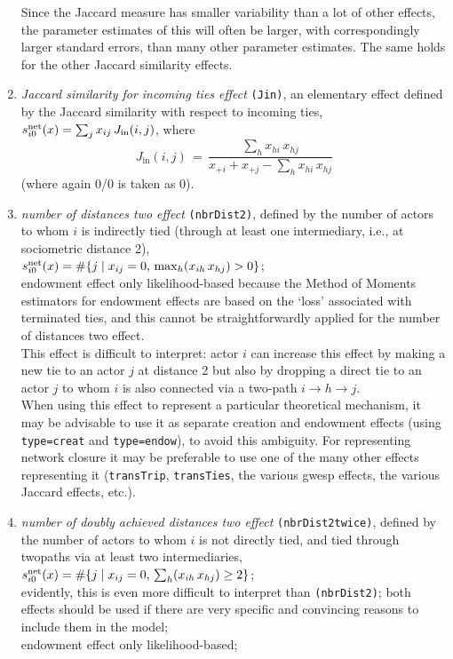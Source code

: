 \documentclass[a4paper,fleqn,11pt]{article}
\newcommand{\+}{\, + \,}
\newcommand{\vit}{\theenumi}
\begin{document}
\begin{enumerate}
 \noindent
 Since the Jaccard measure has smaller variability than a lot of other
 effects, the parameter estimates of this will often be larger,
 with correspondingly larger standard errors,
 than many other parameter estimates. The same holds for
 the other Jaccard similarity effects.

 \item {\em Jaccard similarity for incoming ties effect} \texttt{(Jin)},
 an elementary effect defined by
 the Jaccard similarity with respect to incoming ties,\\
 $s^{\rm net}_{i\vit}(x) =  \sum_j x_{ij} \, J_{\text{in}}(i,j)$, where
 \[
 J_{\text{in}}(i,j) \,=\, \frac{\sum_h x_{hi}\,x_{hj}}
                     {x_{+i} + x_{+j} - \sum_h x_{hi}\,x_{hj}}
 \]
 (where again 0/0 is taken as 0).

 \item {\em number of distances two effect} \texttt{(nbrDist2)},
 \hypertarget{T_dist2}{defined by}
 the number of actors to whom $i$ is indirectly tied
 (through at least one intermediary, i.e., at sociometric distance 2),\\
 $s^{\rm net}_{i\vit}(x) =  \#\{j \mid x_{ij} = 0,\, \max_h (x_{ih}\, x_{hj}) > 0 \}$;\\
 endowment effect only likelihood-based because the Method of Moments
 estimators for endowment effects are based on the `loss' associated
 with terminated ties, and this cannot be straightforwardly applied
 for the number of distances two effect.\\
 This effect is difficult to interpret: actor $i$ can increase this effect by making a
 new tie to an actor $j$ at distance 2 but also by dropping a direct tie to an
 actor $j$ to whom $i$ is also connected via a two-path
 $i \rightarrow h \rightarrow j$.\\
 When using this effect to represent a particular theoretical mechanism,
 it may be advisable to use it as separate creation
 and endowment effects (using  \texttt{type=creat} and \texttt{type=endow}),
 to avoid this ambiguity.
 For representing network closure it may be preferable to use one of the many other
 effects representing it (\texttt{transTrip}, \texttt{transTies},
 the various gwesp effects, the various Jaccard effects, etc.).\\


 \item {\em number of doubly achieved distances two effect} \texttt{(nbrDist2twice)},
 defined by
 the number of actors to whom $i$
 is not directly tied, and tied through twopaths via at least two intermediaries,\\
 $s^{\rm net}_{i\vit}(x) =  \#\{j \mid x_{ij} = 0,\, \sum_h (x_{ih}\, x_{hj}) \geq 2 \}$;\\
 evidently, this is even more difficult to interpret than \texttt{(nbrDist2)};
 both effects should be used if there are very specific
 and convincing reasons to include them in the model;\\
 endowment effect only likelihood-based;\\



\end{enumerate}
\end{document}
